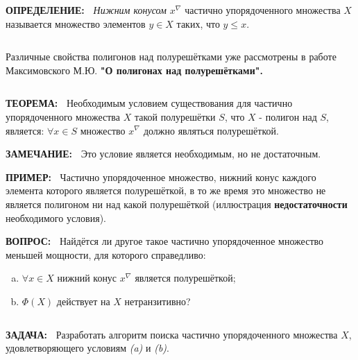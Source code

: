 \documentclass{beamer}
\newcommand{\green}{\color[rgb]{0,0.4,0}}
\newcommand{\red}{\color[rgb]{0.7,0,0}}
\newcommand{\theor}{%
     {\bf \green ТЕОРЕМА:\ }}
\newcommand{\definit}{%
     {\bf \green ОПРЕДЕЛЕНИЕ:\ }}
\newcommand{\examp}{%
     {\bf \green ПРИМЕР:\ }}
\newcommand{\remark}{%
     {\bf \green ЗАМЕЧАНИЕ:\ }}
\newcommand{\question}{%
     {\bf \green ВОПРОС:\ }}
\newcommand{\goal}{%
     {\bf \green ЗАДАЧА:\ }}
\newcommand{\retline}{

$ $

}
\begin{document}
\begin{frame}

{\definit}
\textit{Нижним конусом} $x^\nabla$ частично упорядоченного множества $X$ называется множество элементов $y \in X$ таких, что $y \leq x$.
{\retline}

Различные свойства полигонов над полурешётками уже рассмотрены в работе Максимовского М.Ю.
{\bf {\red} "О полигонах над полурешётками".}

{\retline}
{\theor}
Необходимым условием существования для частично упорядоченного множества $X$ такой полурешётки $S$, что $X$ - полигон над $S$, является: $\forall x \in S$ множество $x^\nabla$ должно являться полурешёткой.

{\remark}
Это условие является необходимым, но не достаточным.
\end{frame}


\begin{frame}

{\examp}
Частично упорядоченное множество, нижний конус каждого элемента которого является полурешёткой, в то же время это множество не является полигоном ни над какой полурешёткой (иллюстрация \textbf{недостаточности} необходимого условия).
\begin{center}
\end{center}
\end{frame}


\begin{frame}

{\question}
Найдётся ли другое такое частично упорядоченное множество меньшей мощности, для которого справедливо:
\begin{enumerate}[(a)]
	\item
$\forall x \in X$ нижний конус $x^\nabla$ является полурешёткой;
	\item
$\Phi(X)$ действует на $X$ нетранзитивно?
\end{enumerate}
{\retline}

{\goal}
Разработать алгоритм поиска частично упорядоченного множества $X$, удовлетворяющего условиям \textit{(a)} и \textit{(b)}.
\end{frame}
\end{document}
